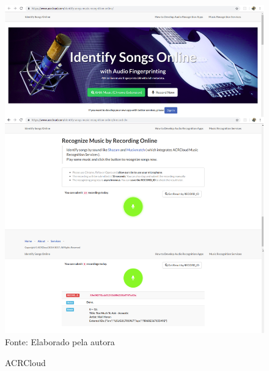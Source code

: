 \begin{figure}[!htb]
   \centering
   \caption{ACRCloud}\label{fig:acrcloud} 
   \includegraphics[scale=0.30]{figuras/acrcloud.png}
   \\Fonte: Elaborado pela autora
\end{figure}


